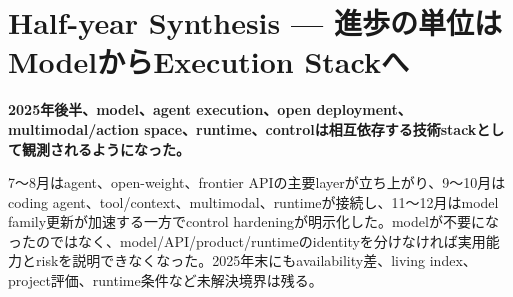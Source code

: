\section{Half-year Synthesis — 進歩の単位はModelからExecution Stackへ}
\noindent\textbf{2025年後半、model、agent execution、open deployment、multimodal/action space、runtime、controlは相互依存する技術stackとして観測されるようになった。}\autocite{src-05738f6c55b7,src-7a7213b68631,src-964121647555,src-aec54e92a7f3,src-b074ccdb2d9e}

7〜8月はagent、open-weight、frontier APIの主要layerが立ち上がり、9〜10月はcoding agent、tool/context、multimodal、runtimeが接続し、11〜12月はmodel family更新が加速する一方でcontrol hardeningが明示化した。modelが不要になったのではなく、model/API/product/runtimeのidentityを分けなければ実用能力とriskを説明できなくなった。2025年末にもavailability差、living index、project評価、runtime条件など未解決境界は残る。\autocite{src-05738f6c55b7,src-12865e8612c7,src-1c46fdf17c79,src-43eaa2f12960,src-455a78bc36fa,src-58ef6e84aa65,src-7a7213b68631,src-964121647555,src-a24fd97eb3d0,src-ad13fe7d3321,src-aec54e92a7f3,src-b074ccdb2d9e,src-dd5d9b8662f3,src-f6aa679babd7}
